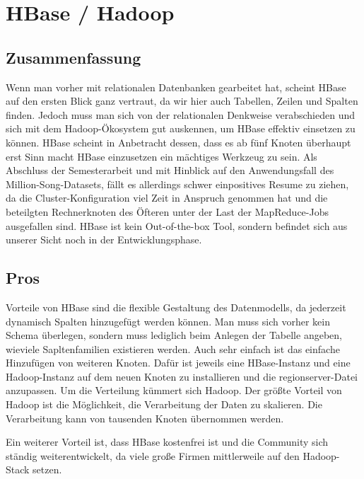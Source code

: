 \section{HBase / Hadoop}
\subsection{Zusammenfassung}
Wenn man vorher mit relationalen Datenbanken gearbeitet hat, scheint HBase auf den ersten Blick ganz vertraut, da wir hier auch Tabellen, Zeilen und Spalten finden. Jedoch muss man sich von der relationalen Denkweise verabschieden und sich mit dem Hadoop-Ökosystem gut auskennen, um HBase effektiv einsetzen zu können. HBase scheint in Anbetracht dessen, dass es ab fünf Knoten überhaupt erst Sinn macht HBase einzusetzen ein mächtiges Werkzeug zu sein. Als Abschluss der Semesterarbeit und mit Hinblick auf den Anwendungsfall des Million-Song-Datasets, fällt es allerdings schwer einpositives Resume zu ziehen, da die Cluster-Konfiguration viel Zeit in Anspruch genommen hat und die beteilgten Rechnerknoten des Öfteren unter der Last der MapReduce-Jobs ausgefallen sind. HBase ist kein Out-of-the-box Tool, sondern befindet sich aus unserer Sicht noch in der Entwicklungsphase.

\subsection{Pros}
Vorteile von HBase sind die flexible Gestaltung des Datenmodells, da jederzeit dynamisch Spalten hinzugefügt werden können. Man muss sich vorher kein Schema überlegen, sondern muss lediglich beim Anlegen der Tabelle angeben, wieviele Sapltenfamilien existieren werden. Auch sehr einfach ist das einfache Hinzufügen von weiteren Knoten. Dafür ist jeweils eine HBase-Instanz und eine Hadoop-Instanz auf dem neuen Knoten zu installieren und die regionserver-Datei anzupassen. Um die Verteilung kümmert sich Hadoop.
Der größte Vorteil von Hadoop ist die Möglichkeit, die Verarbeitung der Daten zu skalieren. Die Verarbeitung kann von tausenden Knoten übernommen werden. %

Ein weiterer Vorteil ist, dass HBase kostenfrei ist und die Community sich ständig weiterentwickelt, da viele große Firmen mittlerweile auf den Hadoop-Stack setzen. 

